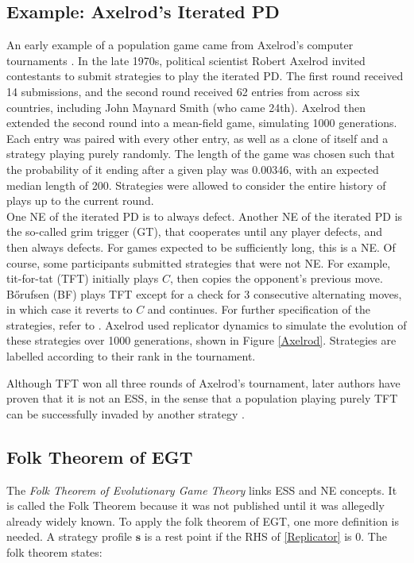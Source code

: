 \subsection{Example: Axelrod's Iterated PD} \label{IPD}
An early example of a population game came from Axelrod's computer tournaments \cite{RN89}. In the late 1970s, political scientist Robert Axelrod invited contestants to submit strategies to play the iterated PD. The first round received 14 submissions, and the second round received 62 entries from across six countries, including John Maynard Smith (who came 24th). Axelrod then extended the second round into a mean-field game, simulating 1000 generations. Each entry was paired with every other entry, as well as a clone of itself and a strategy playing purely randomly. The length of the game was chosen such that the probability of it ending after a given play was 0.00346, with an expected median length of 200. Strategies were allowed to consider the entire history of plays up to the current round. \\

One NE of the iterated PD is to always defect. Another NE of the iterated PD is the so-called grim trigger (GT), that cooperates until any player defects, and then always defects. For games expected to be sufficiently long, this is a NE. Of course, some participants submitted strategies that were not NE. For example, tit-for-tat (TFT) initially plays $C$, then copies the opponent's previous move. B\H{o}rufsen (BF) plays TFT except for a check for 3 consecutive alternating moves, in which case it reverts to $C$ and continues. For further specification of the strategies, refer to \cite{RN89}. Axelrod used replicator dynamics to simulate the evolution of these strategies over 1000 generations, shown in Figure \ref{Axelrod}. Strategies are labelled according to their rank in the tournament. \\
\FloatBarrier
{}
\FloatBarrier

Although TFT won all three rounds of Axelrod's tournament, later authors have proven that it is not an ESS, in the sense that a population playing purely TFT can be successfully invaded by another strategy \cite{RN90}.
\subsection{Folk Theorem of EGT}
The \emph{Folk Theorem of Evolutionary Game Theory} links ESS and NE concepts. It is called the Folk Theorem because it was not published until it was allegedly already widely known. To apply the folk theorem of EGT, one more definition is needed. A strategy profile $\mathbf{s}$ is a rest point if the RHS of \ref{Replicator} is 0. The folk theorem states:

